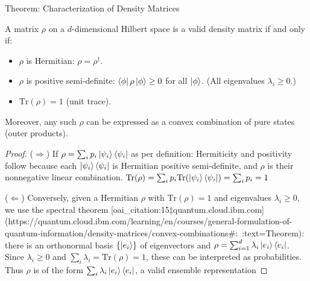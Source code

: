 \begin{frame}{Theorem: Characterization of Density Matrices}
  \begin{theorem}
    A matrix $\rho$ on a $d$-dimensional Hilbert space is a valid density matrix if and only if:
    \begin{itemize}
      \item $\rho$ is Hermitian: $\rho = \rho^\dagger$.
      \item $\rho$ is positive semi-definite: $\bra{\phi}\rho\ket{\phi} \ge 0$ for all $\ket{\phi}$. (All eigenvalues $\lambda_i \ge 0$.)
      \item $\mathrm{Tr}(\rho) = 1$ (unit trace).
    \end{itemize}
    Moreover, any such $\rho$ can be expressed as a convex combination of pure states (outer products).
  \end{theorem}
  \begin{proof}
    ($\Rightarrow$) If $\rho = \sum_i p_i \ket{\psi_i}\bra{\psi_i}$ as per definition:
    Hermiticity and positivity follow because each $\ket{\psi_i}\bra{\psi_i}$ is Hermitian positive semi-definite, and $\rho$ is their nonnegative linear combination. $\mathrm{Tr}(\rho) = \sum_i p_i \mathrm{Tr}(\ket{\psi_i}\bra{\psi_i}) = \sum_i p_i = 1$ %
    
    ($\Leftarrow$) Conversely, given a Hermitian $\rho$ with $\mathrm{Tr}(\rho)=1$ and eigenvalues $\lambda_i \ge 0$, we use the spectral theorem [oai_citation:15‡quantum.cloud.ibm.com](https://quantum.cloud.ibm.com/learning/en/courses/general-formulation-of-quantum-information/density-matrices/convex-combinations#:~:text=Theorem): there is an orthonormal basis $\{\ket{e_i}\}$ of eigenvectors and $\rho = \sum_{i=1}^d \lambda_i \ket{e_i}\bra{e_i}$. Since $\lambda_i \ge 0$ and $\sum_i \lambda_i = \mathrm{Tr}(\rho) = 1$, these can be interpreted as probabilities. Thus $\rho$ is of the form $\sum_i \lambda_i \ket{e_i}\bra{e_i}$, a valid ensemble representation %
  \end{proof}
\end{frame}


